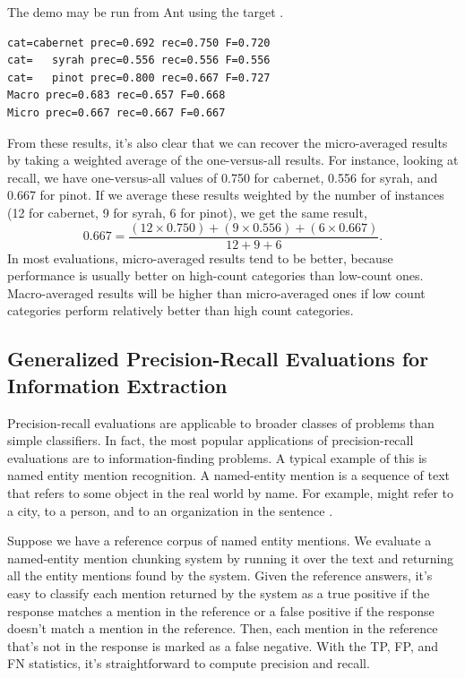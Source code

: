 The demo may be run from Ant using the target .
%
\begin{verbatim}
cat=cabernet prec=0.692 rec=0.750 F=0.720
cat=   syrah prec=0.556 rec=0.556 F=0.556
cat=   pinot prec=0.800 rec=0.667 F=0.727
Macro prec=0.683 rec=0.657 F=0.668
Micro prec=0.667 rec=0.667 F=0.667
\end{verbatim}
%
From these results, it's also clear that we can recover the
micro-averaged results by taking a weighted average of the
one-versus-all results.  For instance, looking at recall, we have
one-versus-all values of 0.750 for cabernet, 0.556 for syrah, and
0.667 for pinot.  If we average these results weighted by
the number of instances (12 for cabernet, 9 for syrah, 6 for pinot),
we get the same result,
%
\begin{equation}
0.667 = \frac{(12 \times 0.750) + (9 \times 0.556) + (6 \times 0.667)}{12 + 9 + 6}.
\end{equation}
%
In most evaluations, micro-averaged results tend to be better, because
performance is usually better on high-count categories than low-count
ones.  Macro-averaged results will be higher than micro-averaged ones
if low count categories perform relatively better than high count
categories.

\subsection{Generalized Precision-Recall Evaluations for Information Extraction}

Precision-recall evaluations are applicable to broader classes of
problems than simple classifiers.  In fact, the most popular
applications of precision-recall evaluations are to
information-finding problems.  A typical example of this is named
entity mention recognition.  A named-entity mention is a sequence of
text that refers to some object in the real world by name.  For
example,  might refer to a city,
 to a person, and 
to an organization in the sentence .

Suppose we have a reference corpus of named entity mentions.  We
evaluate a named-entity mention chunking system by running it over the
text and returning all the entity mentions found by the system.  Given
the reference answers, it's easy to classify each mention returned by
the system as a true positive if the response matches a mention in the
reference or a false positive if the response doesn't match a mention
in the reference.  Then, each mention in the reference that's not in
the response is marked as a false negative.  With the TP, FP, and FN
statistics, it's straightforward to compute precision and recall.

